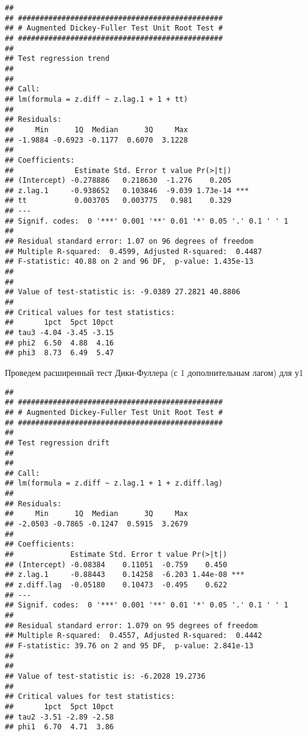 \documentclass[
]{article}
\newenvironment{Shaded}{\begin{snugshade}}{\end{snugshade}}
\newcommand{\AttributeTok}[1]{\textcolor[rgb]{0.13,0.29,0.53}{#1}}
\newcommand{\DecValTok}[1]{\textcolor[rgb]{0.00,0.00,0.81}{#1}}
\newcommand{\FunctionTok}[1]{\textcolor[rgb]{0.13,0.29,0.53}{\textbf{#1}}}
\newcommand{\NormalTok}[1]{#1}
\newcommand{\SpecialCharTok}[1]{\textcolor[rgb]{0.81,0.36,0.00}{\textbf{#1}}}
\newcommand{\StringTok}[1]{\textcolor[rgb]{0.31,0.60,0.02}{#1}}
\begin{document}
\begin{verbatim}
## 
## ############################################### 
## # Augmented Dickey-Fuller Test Unit Root Test # 
## ############################################### 
## 
## Test regression trend 
## 
## 
## Call:
## lm(formula = z.diff ~ z.lag.1 + 1 + tt)
## 
## Residuals:
##     Min      1Q  Median      3Q     Max 
## -1.9884 -0.6923 -0.1177  0.6070  3.1228 
## 
## Coefficients:
##              Estimate Std. Error t value Pr(>|t|)    
## (Intercept) -0.278886   0.218630  -1.276    0.205    
## z.lag.1     -0.938652   0.103846  -9.039 1.73e-14 ***
## tt           0.003705   0.003775   0.981    0.329    
## ---
## Signif. codes:  0 '***' 0.001 '**' 0.01 '*' 0.05 '.' 0.1 ' ' 1
## 
## Residual standard error: 1.07 on 96 degrees of freedom
## Multiple R-squared:  0.4599, Adjusted R-squared:  0.4487 
## F-statistic: 40.88 on 2 and 96 DF,  p-value: 1.435e-13
## 
## 
## Value of test-statistic is: -9.0389 27.2821 40.8806 
## 
## Critical values for test statistics: 
##       1pct  5pct 10pct
## tau3 -4.04 -3.45 -3.15
## phi2  6.50  4.88  4.16
## phi3  8.73  6.49  5.47
\end{verbatim}

Проведем расширенный тест Дики-Фуллера (с 1 дополнительным лагом) для у1

\begin{Shaded}
\end{Shaded}

\begin{verbatim}
## 
## ############################################### 
## # Augmented Dickey-Fuller Test Unit Root Test # 
## ############################################### 
## 
## Test regression drift 
## 
## 
## Call:
## lm(formula = z.diff ~ z.lag.1 + 1 + z.diff.lag)
## 
## Residuals:
##     Min      1Q  Median      3Q     Max 
## -2.0503 -0.7865 -0.1247  0.5915  3.2679 
## 
## Coefficients:
##             Estimate Std. Error t value Pr(>|t|)    
## (Intercept) -0.08384    0.11051  -0.759    0.450    
## z.lag.1     -0.88443    0.14258  -6.203 1.44e-08 ***
## z.diff.lag  -0.05180    0.10473  -0.495    0.622    
## ---
## Signif. codes:  0 '***' 0.001 '**' 0.01 '*' 0.05 '.' 0.1 ' ' 1
## 
## Residual standard error: 1.079 on 95 degrees of freedom
## Multiple R-squared:  0.4557, Adjusted R-squared:  0.4442 
## F-statistic: 39.76 on 2 and 95 DF,  p-value: 2.841e-13
## 
## 
## Value of test-statistic is: -6.2028 19.2736 
## 
## Critical values for test statistics: 
##       1pct  5pct 10pct
## tau2 -3.51 -2.89 -2.58
## phi1  6.70  4.71  3.86
\end{verbatim}
\end{document}
